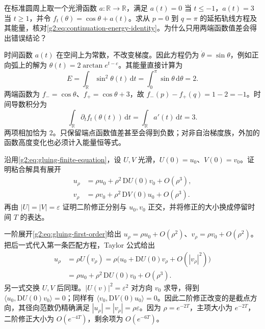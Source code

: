 \begin{exercise}\label{g2:ex:continuation-energy-time-constant}
	在标准圆周上取一个光滑函数 \(a:\mathbb R\to\mathbb R\)，满足 \(a(t)=0\) 当 \(t\le-1\)，\(a(t)=3\) 当 \(t\ge1\)，并令 \(f_t(\theta)=\cos\theta+a(t)\)。求从 \(p=0\) 到 \(q=\pi\) 的延拓轨线方程及其能量，核对\eqref{g2:eq:continuation-energy-identity}。为什么只用两端函数值差会得出错误结论？
\end{exercise}
\begin{solution}
	时间函数 \(a(t)\) 在空间上为常数，不改变梯度。因此方程仍为 \(\dot\theta=\sin\theta\)，例如正向弧上的解为 \(\theta(t)=2\arctan e^{t-c}\)。其能量直接计算为
	\[
		E=\int_{\mathbb R}\sin^2\theta(t)\,\mathrm{d}t
		=\int_0^\pi\sin\theta\,\mathrm{d}\theta=2.
	\]
	两端函数为 \(f_-=\cos\theta\)、\(f_+=\cos\theta+3\)，故 \(f_-(p)-f_+(q)=1-2=-1\)。时间导数积分为
	\[
		\int_{\mathbb R}\partial_t f_t(\theta(t))\,\mathrm{d}t
		=\int_{\mathbb R}a'(t)\,\mathrm{d}t=3.
	\]
	两项相加恰为 \(2\)。只保留端点函数值差甚至会得到负数；对非自治梯度族，外加的函数高度变化也必须计入能量恒等式。
\end{solution}

\begin{exercise}\label{g2:ex:gluing-second-order}
	沿用\eqref{g2:eq:gluing-finite-equation}，设 \(U,V\) 光滑，\(U(0)=u_0\)、\(V(0)=v_0\)。证明粘合解具有展开
	\[
		\begin{aligned}
			u_\rho&=\rho u_0+\rho^2\,\mathrm DU(0)v_0+O(\rho^3),\\
			v_\rho&=\rho v_0+\rho^2\,\mathrm DV(0)u_0+O(\rho^3).
		\end{aligned}
	\]
	再由 \(|U|=|V|=\varepsilon\) 证明二阶修正分别与 \(u_0,v_0\) 正交，并将修正的大小换成停留时间 \(T\) 的表达。
\end{exercise}
\begin{solution}
	一阶展开\eqref{g2:eq:gluing-first-order}给出 \(u_\rho=\rho u_0+O(\rho^2)\)、\(v_\rho=\rho v_0+O(\rho^2)\)。把后一式代入第一条匹配方程，Taylor 公式给出
	\[
		\begin{aligned}
			u_\rho
			&=\rho U(v_\rho)
			=\rho\bigl(u_0+\mathrm DU(0)v_\rho+O(|v_\rho|^2)\bigr)\\
			&=\rho u_0+\rho^2\,\mathrm DU(0)v_0+O(\rho^3).
		\end{aligned}
	\]
	另一式交换 \(U,V\) 后同理。\(|U(v)|^2=\varepsilon^2\) 对方向 \(v_0\) 求导，得到 \(\langle u_0,\mathrm DU(0)v_0\rangle=0\)；同样有 \(\langle v_0,\mathrm DV(0)u_0\rangle=0\)。因此二阶修正改变的是截点方向，其径向范数仍精确满足 \(|u_\rho|=|v_\rho|=\rho\varepsilon\)。因为 \(\rho=e^{-2T}\)，主项大小为 \(e^{-2T}\)，二阶修正大小为 \(O(e^{-4T})\)，剩余项为 \(O(e^{-6T})\)。
\end{solution}

